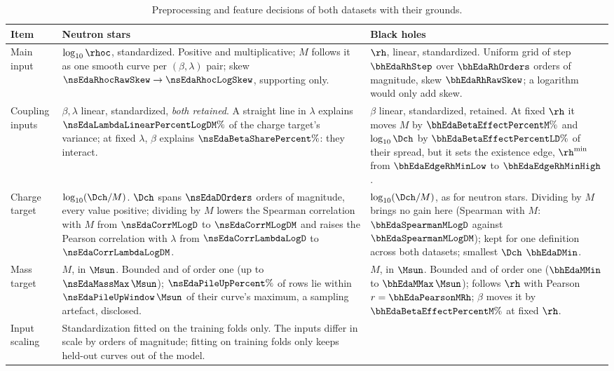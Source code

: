\begin{table}[!htb]
\centering
\caption{Preprocessing and feature decisions of both datasets with their grounds.}
\label{tab:decisions}
\renewcommand{\arraystretch}{1.2}
\small
\begin{tabular}{p{2.0cm} p{4.6cm} p{4.6cm}}
\toprule
Item & Neutron stars & Black holes \\
\midrule
Main input &
$\log_{10}\rhoc$, standardized. Positive and multiplicative; $M$ follows it as one smooth curve per $(\beta, \lambda)$ pair; skew $\nsEdaRhocRawSkew \to \nsEdaRhocLogSkew$, supporting only. &
$\rh$, linear, standardized. Uniform grid of step $\bhEdaRhStep$ over $\bhEdaRhOrders$ orders of magnitude, skew $\bhEdaRhRawSkew$; a logarithm would only add skew. \\
Coupling inputs &
$\beta, \lambda$ linear, standardized, \emph{both retained}. A straight line in $\lambda$ explains $\nsEdaLambdaLinearPercentLogDM\%$ of the charge target's variance; at fixed $\lambda$, $\beta$ explains $\nsEdaBetaSharePercent\%$: they interact. &
$\beta$ linear, standardized, retained. At fixed $\rh$ it moves $M$ by $\bhEdaBetaEffectPercentM\%$ and $\log_{10}\Dch$ by $\bhEdaBetaEffectPercentLD\%$ of their spread, but it sets the existence edge, $\rh^{\min}$ from $\bhEdaEdgeRhMinLow$ to $\bhEdaEdgeRhMinHigh$. \\
Charge target &
$\log_{10}(\Dch/M)$. $\Dch$ spans $\nsEdaDOrders$ orders of magnitude, every value positive; dividing by $M$ lowers the Spearman correlation with $M$ from $\nsEdaCorrMLogD$ to $\nsEdaCorrMLogDM$ and raises the Pearson correlation with $\lambda$ from $\nsEdaCorrLambdaLogD$ to $\nsEdaCorrLambdaLogDM$. &
$\log_{10}(\Dch/M)$, as for neutron stars. Dividing by $M$ brings no gain here (Spearman with $M$: $\bhEdaSpearmanMLogD$ against $\bhEdaSpearmanMLogDM$); kept for one definition across both datasets; smallest $\Dch$ $\bhEdaDMin$. \\
Mass target &
$M$, in $\Msun$. Bounded and of order one (up to $\nsEdaMassMax\,\Msun$); $\nsEdaPileUpPercent\%$ of rows lie within $\nsEdaPileUpWindow\,\Msun$ of their curve's maximum, a sampling artefact, disclosed. &
$M$, in $\Msun$. Bounded and of order one ($\bhEdaMMin$ to $\bhEdaMMax\,\Msun$); follows $\rh$ with Pearson $r = \bhEdaPearsonMRh$; $\beta$ moves it by $\bhEdaBetaEffectPercentM\%$ at fixed $\rh$. \\
Input scaling &
Standardization fitted on the training folds only. The inputs differ in scale by orders of magnitude; fitting on training folds only keeps held-out curves out of the model. &

\end{tabular}
\end{table}
